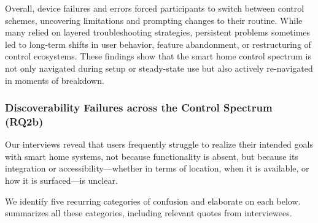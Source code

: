 Overall, device failures and errors forced participants to switch between control schemes, uncovering limitations and prompting changes to their routine. While many relied on layered troubleshooting strategies, persistent problems sometimes led to long-term shifts in user behavior, feature abandonment, or restructuring of control ecosystems. These findings show that the smart home control spectrum is not only navigated during setup or steady-state use but also actively re-navigated in moments of breakdown.

\subsubsection{Discoverability Failures across the Control Spectrum (RQ2b)}
\label{cic:sec:confusion}

Our interviews reveal that users frequently struggle to realize their intended goals with smart home systems, not because functionality is absent, but because its integration or accessibility---whether in terms of location, when it is available, or how it is surfaced---is unclear.

We identify five recurring categories of confusion and elaborate on each below.  summarizes all these categories, including relevant quotes from interviewees.


